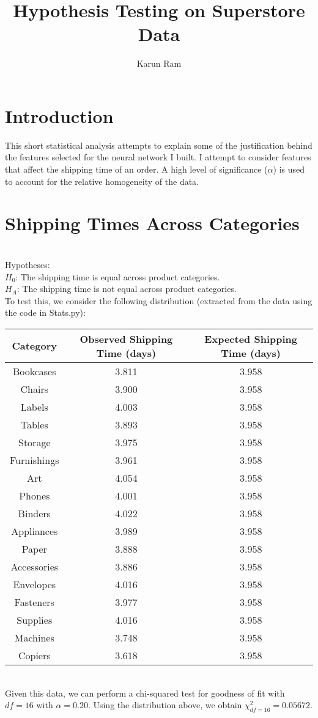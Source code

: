 \documentclass[11pt]{amsart}
\title{Hypothesis Testing on Superstore Data}
\author{Karun Ram}
\begin{document}
\maketitle
\section{Introduction} 
This short statistical analysis attempts to explain some of the justification behind the features selected for the neural network I built. I attempt to consider features that affect the shipping time of an order. A high level of significance ($\alpha$) is used to account for the relative homogeneity of the data.
\newpage
\section{Shipping Times Across Categories} 
\hrulefill \\
Hypotheses: \\
$H_0$: The shipping time is equal across product categories.\\
$H_A$: The shipping time is not equal across product categories. \\

To test this, we consider the following distribution (extracted from the data using the code in Stats.py):
\begin{center}
\begin{tabular}{ |c|c|c| } 
 \hline
 Category & Observed Shipping Time (days)& Expected Shipping Time (days) \\ 
\hline
\hline
Bookcases & 3.811 & 3.958\\
Chairs & 3.900 & 3.958\\
Labels & 4.003 & 3.958\\
Tables & 3.893 & 3.958\\
Storage & 3.975 & 3.958\\
Furnishings & 3.961 & 3.958\\
Art & 4.054 & 3.958\\
Phones & 4.001 & 3.958\\
Binders & 4.022 & 3.958\\
Appliances & 3.989 & 3.958\\
Paper & 3.888 & 3.958\\
Accessories & 3.886 & 3.958\\
Envelopes & 4.016 & 3.958\\
Fasteners & 3.977 & 3.958\\
Supplies & 4.016 & 3.958\\
Machines & 3.748 & 3.958\\
Copiers & 3.618 & 3.958\\
 \hline
\end{tabular}
\end{center}
\hfill \\
Given this data, we can perform a chi-squared test for goodness of fit with $df=16$ with $\alpha=0.20$. Using the distribution above, we obtain $\chi^2_{df=16}=0.05672$. \\
\end{document}
